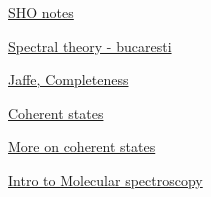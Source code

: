 \href{http://inside.mines.edu/~lwiencke/PH300/F12/Quantum/L22-post.pdf}{SHO notes}

\href{https://www.math.u-psud.fr/~helffer/m2bucarest2010.pdf}{Spectral theory - bucaresti}

\href{http://isites.harvard.edu/fs/docs/icb.topic815933.files/Completeness-3Oct2010-4.pdf}{Jaffe, Completeness}

\href{http://homepage.univie.ac.at/reinhold.bertlmann/pdfs/T2_Skript_Ch_5.pdf}{Coherent states}

\href{http://hitoshi.berkeley.edu/221a/coherentstate.pdf}{More on coherent states}


\href{http://depa.fquim.unam.mx/amyd/archivero/DiatomicMolecule_1314.pdf}{Intro to Molecular spectroscopy}



